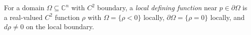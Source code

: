 
For a domain $\Omega\subseteq\mathbb C^n$ with $C^2$ boundary, a \emph{local defining function} near $p\in\partial\Omega$ is a real-valued $C^2$ function $\rho$ with $\Omega=\{\rho<0\}$ locally, $\partial\Omega=\{\rho=0\}$ locally, and $d\rho\ne0$ on the local boundary.
